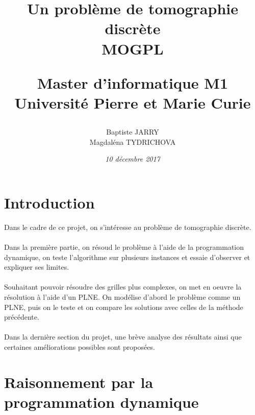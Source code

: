\documentclass[10pt,a4paper]{article}
\title{%
        \LARGE \textbf {Un problème de tomographie discrète}\\
        \vspace{8mm}
        \large \textbf{MOGPL}\\
        \vspace{10mm}
        \author{Baptiste JARRY \\ Magdaléna TYDRICHOVA}
        \large {Master d'informatique M1}\\
          \vspace{5mm}
        \large {Université Pierre et Marie Curie \vspace{15mm}}\\ 
        \date{\vspace{10mm} \textsf{\textrm{\textit{10 décembre 2017}}}}}
\begin{document}
\maketitle
\thispagestyle{empty}
\newpage
\section*{Introduction}
\addtocounter{page}{-1}
\noindent
Dans le cadre de ce projet, on s'intéresse au problème de tomographie discrète. \\ \\
\noindent
Dans la première partie, on résoud le problème à l'aide de la programmation dynamique, on teste l'algorithme sur plusieurs instances et essaie d'observer et expliquer ses limites. \\ \\
\noindent
Souhaitant pouvoir résoudre des grilles plus complexes, on met en oeuvre la résolution à l'aide d'un PLNE. On modélise d'abord le problème comme un PLNE, puis on le teste et on compare les solutions avec celles de la méthode précédente. \\ \\ 
\noindent
Dans la dernière section du projet, une brève analyse des résultats ainsi que certaines améliorations possibles sont proposées. 
\newpage
\section{Raisonnement par la programmation dynamique}
\end{document}
